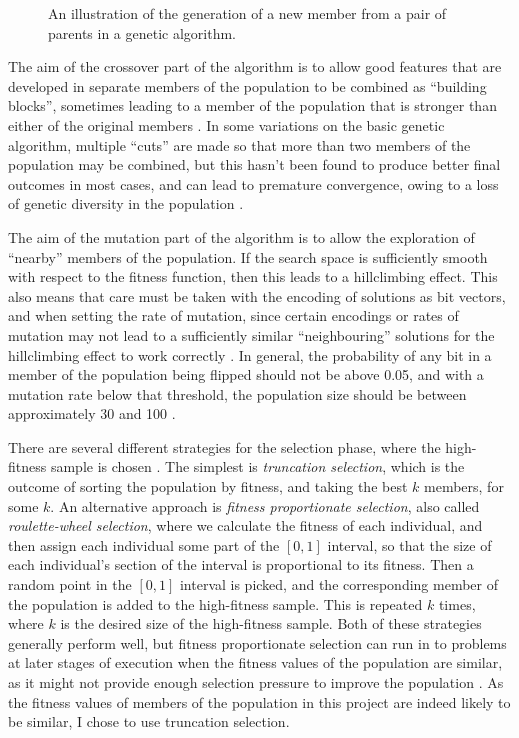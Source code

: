 \documentclass[proof,pdftex,11pt,a4,titlepage]{article}
\begin{document}
\begin{figure}[h]
  
  \caption{An illustration of the generation of a new member from a pair of parents in a genetic algorithm.}
  \label{fig:genetic-algo}
\end{figure}

The aim of the crossover part of the algorithm is to allow good features that are developed in separate members of the population to be combined as ``building blocks'', sometimes leading to a member of the population that is stronger than either of the original members \cite{Goldberg:1989}. In some variations on the basic genetic algorithm, multiple ``cuts'' are made so that more than two members of the population may be combined, but this hasn't been found to produce better final outcomes in most cases, and can lead to premature convergence, owing to a loss of genetic diversity in the population \cite{Esquivel:1997}.

The aim of the mutation part of the algorithm is to allow the exploration of ``nearby'' members of the population. If the search space is sufficiently smooth with respect to the fitness function, then this leads to a hillclimbing effect. This also means that care must be taken with the encoding of solutions as bit vectors, and when setting the rate of mutation, since certain encodings or rates of mutation may not lead to a sufficiently similar ``neighbouring'' solutions for the hillclimbing effect to work correctly \cite{Taher:2013}. In general, the probability of any bit in a member of the population being flipped should not be above 0.05, and with a mutation rate below that threshold, the population size should be between approximately 30 and 100 \cite{Grefenstette:1986}.

There are several different strategies for the selection phase, where the high-fitness sample is chosen \cite{Thierens:1994}. The simplest is \emph{truncation selection}, which is the outcome of sorting the population by fitness, and taking the best $k$ members, for some $k$. An alternative approach is \emph{fitness proportionate selection}, also called \emph{roulette-wheel selection}, where we calculate the fitness of each individual, and then assign each individual some part of the $[0,1]$ interval, so that the size of each individual's section of the interval is proportional to its fitness. Then a random point in the $[0,1]$ interval is picked, and the corresponding member of the population is added to the high-fitness sample. This is repeated $k$ times, where $k$ is the desired size of the high-fitness sample. Both of these strategies generally perform well, but fitness proportionate selection can run in to problems at later stages of execution when the fitness values of the population are similar, as it might not provide enough selection pressure to improve the population \cite{Whitley:1989}. As the fitness values of members of the population in this project are indeed likely to be similar, I chose to use truncation selection.
\end{document}
